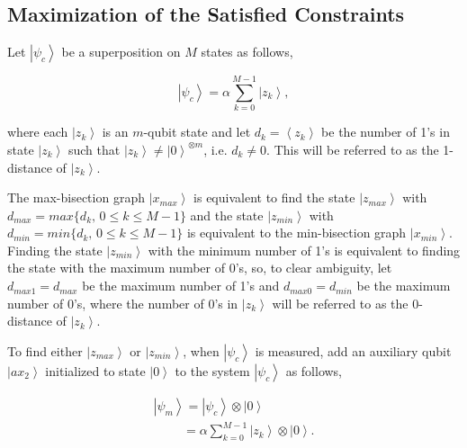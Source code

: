 \documentclass[a4paper]{article}
\begin{document}
\subsection{Maximization of the Satisfied Constraints}

Let $\left| {\psi _c } \right\rangle$ be a superposition on $M$ states as follows,

\begin{equation} 
\left| {\psi _c } \right\rangle  = \alpha \sum\limits_{k = 0}^{M - 1} { \left| {z_k } \right\rangle }, 
\end{equation}

\noindent
where each $\left| {z_k } \right\rangle$ is an $m$-qubit state 
and let $d_k=\left\langle {z_k } \right\rangle$ be the number of 1's in state  $\left| {z_k } \right\rangle$ such that 
$\left| {z_k } \right\rangle \ne \left| {0 } \right\rangle^{\otimes m}$, i.e. $d_k \ne 0$. This will be referred to as the 
1-distance of $\left| {z_k } \right\rangle$.

The max-bisection graph $\left| {x_{max}} \right\rangle$ is equivalent to find the state 
$\left| {z_{max}} \right\rangle$ with $d_{max}=max\{d_k,\,0\le k \le M-1\}$ 
and the state $\left| {z_{min} } \right\rangle$ with $d_{min}=min\{d_k,\,0\le k \le M-1\}$ is equivalent to 
the min-bisection graph $\left| {x_{min}} \right\rangle$. 
Finding the state $\left| {z_{min} } \right\rangle$ with the minimum number of 1's is equivalent to 
finding the state with the maximum number of 0's, so, to clear ambiguity, 
let $d_{max1}=d_{max}$ be the maximum number of 1's and $d_{max0}=d_{min}$ be the maximum number of 0's, 
where the number of 0's in $\left| {z_k } \right\rangle$ will be referred to as the 0-distance 
of $\left| {z_k } \right\rangle$. 

To find either $\left| {z_{max} } \right\rangle$ or $\left| {z_{min} } \right\rangle$, 
when $\left| {\psi _c } \right\rangle$ is measured, add an auxiliary qubit $\left| {ax_2 } \right\rangle$ initialized to state 
$\left| 0 \right\rangle$ to the system $\left| {\psi _c } \right\rangle$ as follows,

\begin{equation} 
\begin{array}{l}
\left| {\psi _m } \right\rangle  = \left| {\psi _c } \right\rangle \otimes \left| 0 \right\rangle\\
\,\,\,\,\,\,\,\,\,\,\,\,\,\,= \alpha \sum\limits_{k = 0}^{M - 1} { \left| {z_k } \right\rangle } \otimes \left| 0 \right\rangle.\\
\end{array}
\end{equation}
\end{document}
